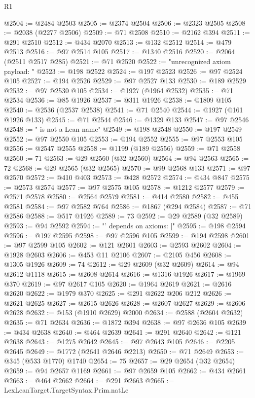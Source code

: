 \begin{lexlean}{R1}
\begin{coremodule}
{{{{{{{{{{{{{{{{{{{{{{{{{{{{{{{{{{{{{{{{{{{{{{{{{{{{{{{{{{{{{{{{{{{{{{{{{{{{{{{{{{{{{{{{{{{{{{{{{{{{{{{{{{{{{{{{{{{{{{{{{{{{{{{{{{{{{{{{{{{{{{{{{{{{{{{{{{{{{{{{{{{{{{{{{{{{{{{{{{{{{{{{{{@2504 := @2484 @2503
@2505 := @2374 @2504
@2506 := @2323 @2505
@2508 := @2038 (@2277 @2506)
@2509 := @71 @2508
@2510 := @2162 @394
@2511 := @291 @2510
@2512 := @434 @2070
@2513 := @132 @2512
@2514 := @479 @2513
@2516 := @97 @2514 @105
@2517 := @1340 @2516
@2520 := @2064 (@2511 @2517 @285)
@2521 := @71 @2520
@2522 := "unrecognized axiom payload: "
@2523 := @198 @2522
@2524 := @197 @2523
@2526 := @97 @2524 @105
@2527 := @194 @2526
@2529 := @97 @2527 @133
@2530 := @189 @2529
@2532 := @97 @2530 @105
@2534 := @1927 (@1964 @2532)
@2535 := @71 @2534
@2536 := @85 @1926
@2537 := @311 @1926
@2538 := @1809 @105
@2540 := @2536 (@2537 @2538)
@2541 := @71 @2540
@2544 := @1927 (@161 @1926 @133)
@2545 := @71 @2544
@2546 := @1329 @133
@2547 := @97 @2546
@2548 := " is not a Lean name"
@2549 := @198 @2548
@2550 := @197 @2549
@2552 := @97 @2550 @105
@2553 := @194 @2552
@2555 := @97 @2553 @105
@2556 := @2547 @2555
@2558 := @1199 (@189 @2556)
@2559 := @71 @2558
@2560 := 71
@2563 := @29 @2560 (@32 @2560)
@2564 := @94 @2563
@2565 := 72
@2568 := @29 @2565 (@32 @2565)
@2570 := @99 @2568 @133
@2571 := @97 @2570
@2572 := @410 @403
@2573 := @428 @2572
@2574 := @434 @847
@2575 := @2573 @2574
@2577 := @97 @2575 @105
@2578 := @1212 @2577
@2579 := @2571 @2578
@2580 := @2564 @2579
@2581 := @414 @2580
@2582 := @455 @2581
@2584 := @97 @2582 @764
@2586 := @1867 (@294 @2584)
@2587 := @71 @2586
@2588 := @517 @1926
@2589 := 73
@2592 := @29 @2589 (@32 @2589)
@2593 := @94 @2592
@2594 := "' depends on axioms: ["
@2595 := @198 @2594
@2596 := @197 @2595
@2598 := @97 @2596 @105
@2599 := @194 @2598
@2601 := @97 @2599 @105
@2602 := @121 @2601
@2603 := @2593 @2602
@2604 := @1928 @2603
@2606 := @453 @11 @2106
@2607 := @2105 @456
@2608 := @1305 @1926
@2609 := 74
@2612 := @29 @2609 (@32 @2609)
@2614 := @94 @2612 @1118
@2615 := @2608 @2614
@2616 := @1316 @1926
@2617 := @1969 @370
@2619 := @97 @2617 @105
@2620 := @1964 @2619
@2621 := @2616 @2620
@2622 := @1979 @370
@2625 := @291 @2622 @206 @212
@2626 := @2621 @2625
@2627 := @2615 @2626
@2628 := @2607 @2627
@2629 := @2606 @2628
@2632 := @153 (@1910 @2629) @2000
@2634 := @2588 (@2604 @2632)
@2635 := @71 @2634
@2636 := @1872 @394
@2638 := @97 @2636 @105
@2639 := @434 @2638
@2640 := @464 @2639
@2641 := @291 @2640
@2642 := @121 @2638
@2643 := @1275 @2642
@2645 := @97 @2643 @105
@2646 := @2205 @2645
@2649 := @1772 (@2641 @2646 @2213)
@2650 := @71 @2649
@2653 := @345 (@533 @1770) @1740
@2654 := 75
@2657 := @29 @2654 (@32 @2654)
@2659 := @94 @2657 @1169
@2661 := @97 @2659 @105
@2662 := @434 @2661
@2663 := @464 @2662
@2664 := @291 @2663
@2665 := LexLeanTarget.TargetSyntax.Prim.natLe
}}}}}}}}}}}}}}}}}}}}}}}}}}}}}}}}}}}}}}}}}}}}}}}}}}}}}}}}}}}}}}}}}}}}}}}}}}}}}}}}}}}}}}}}}}}}}}}}}}}}}}}}}}}}}}}}}}}}}}}}}}}}}}}}}}}}}}}}}}}}}}}}}}}}}}}}}}}}}}}}}}}}}}}}}}}}}}}}}}}}}}}}}}
\end{coremodule}
\end{lexlean}
